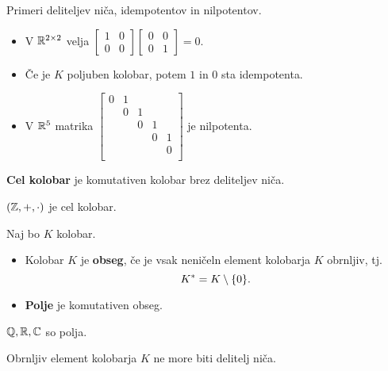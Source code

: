 \begin{zgled}
    Primeri deliteljev niča, idempotentov in nilpotentov.
    \begin{itemize}
        \item V $\mathbb{R}^{2 \times 2}$ velja $\begin{bmatrix}
            1 & 0 \\ 0 & 0
        \end{bmatrix} \begin{bmatrix}
            0 & 0 \\ 0 & 1
        \end{bmatrix} = 0$.
        \item Če je $K$ poljuben kolobar, potem $1$ in $0$ sta idempotenta.
        \item V $\mathbb{R}^5$ matrika $\begin{bmatrix}
            0 & 1 & & & \\ 
            & 0 & 1 & & \\ 
            & & 0 & 1 & \\ 
            & & & 0 & 1 \\ 
            & & &  & 0 \\ 
        \end{bmatrix}$ je nilpotenta.
    \end{itemize}
\end{zgled}

\begin{definicija}
    \textbf{Cel kolobar} je komutativen kolobar brez deliteljev niča.
\end{definicija}

\begin{primer}
    $(\mathbb{Z}, +, \cdot)$ je cel kolobar.
\end{primer}

\begin{definicija}
    Naj bo $K$ kolobar.
    \begin{itemize}
        \item Kolobar $K$ je \textbf{obseg}, če je vsak neničeln element kolobarja $K$ obrnljiv, tj.\ $$K^* = K \setminus \{0\}.$$ 
        \item \textbf{Polje} je komutativen obseg.
    \end{itemize}
\end{definicija}

\begin{primer}
    $\mathbb{Q}, \mathbb{R}, \mathbb{C}$ so polja.
\end{primer}

\begin{trditev}
    Obrnljiv element kolobarja $K$ ne more biti delitelj niča.
\end{trditev}

